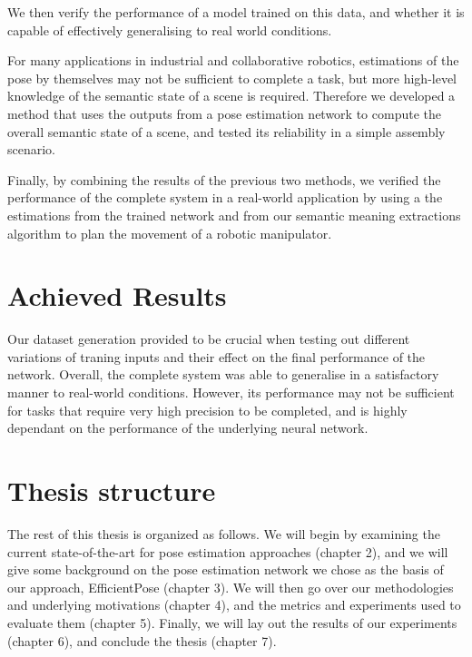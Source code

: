 We then verify the performance of a model trained on this data, and whether it is capable of effectively generalising to real world conditions.

For many applications in industrial and collaborative robotics, estimations of the pose by themselves may not be sufficient to complete a task, but more high-level knowledge of the semantic state of a scene is required. Therefore we developed a method that uses the outputs from a pose estimation network to compute the overall semantic state of a scene, and tested its reliability in a simple assembly scenario.

Finally, by combining the results of the previous two methods, we verified the performance of the complete system in a real-world application by using a the estimations from the trained network and from our semantic meaning extractions algorithm to plan the movement of a robotic manipulator. 

\section{Achieved Results}

Our dataset generation provided to be crucial when testing out different variations of traning inputs and their effect on the final performance of the network. Overall, the complete system was able to generalise in a satisfactory manner to real-world conditions. However, its performance may not be sufficient for tasks that require very high precision to be completed, and is highly dependant on the performance of the underlying neural network.

\section{Thesis structure}
The rest of this thesis is organized as follows.  We will begin by examining the current state-of-the-art for pose estimation approaches (chapter 2), and we will give some background on the pose estimation network we chose as the basis of our approach, EfficientPose (chapter 3). We will then go over our methodologies and underlying motivations (chapter 4), and the metrics and experiments used to evaluate them (chapter 5). Finally, we will lay out the results of our experiments (chapter 6), and conclude the thesis (chapter 7).
